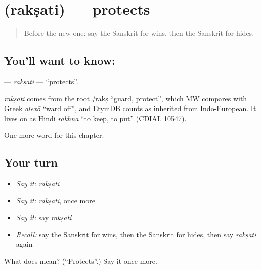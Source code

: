 \section[\texorpdfstring{\sk{रक्षति} (rakṣati)}{रक्षति (rakṣati)}]{ (rakṣati) — protects}

\label{lesson:SA-C137-raksati}



\begin{quote}
Before the new one: say the Sanskrit for wins, then the Sanskrit for hides.
\end{quote}

\subsection*{You'll want to know: }
\textbf{} — \emph{rakṣati} — \textquotedblleft{}protects\textquotedblright{}.

\begin{cousinweb}
\emph{rakṣati} comes from the root √rakṣ \textquotedblleft{}guard, protect\textquotedblright{}, which MW compares with Greek \emph{alexō} \textquotedblleft{}ward off\textquotedblright{}, and EtymDB counts as inherited from Indo-European. It lives on as Hindi \emph{rakhnā} \textquotedblleft{}to keep, to put\textquotedblright{} (CDIAL 10547).
\end{cousinweb}

\begin{grammarlens}[title={What you've built}]
One more word for this chapter.
\end{grammarlens}

\subsection*{Your turn}
\begin{itemize}
\raggedright
  \item \emph{Say it:} \emph{rakṣati}
  \item \emph{Say it:} \emph{rakṣati}, once more
  \item \emph{Say it:} say \emph{rakṣati}
  \item \emph{Recall:} say the Sanskrit for wins, then the Sanskrit for hides, then say \emph{rakṣati} again
\end{itemize}

\begin{tcolorbox}[breakable,colback=teal!4,colframe=teal!35!black,title={Before you move on}]
What does  mean? (\textquotedblleft{}Protects\textquotedblright{}.) Say it once more.
\end{tcolorbox}

